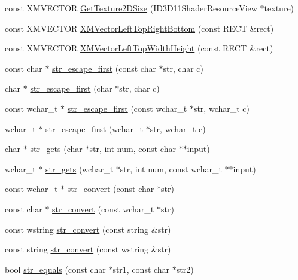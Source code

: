 \begin{DoxyCompactItemize}
\item 
const X\+M\+V\+E\+C\+T\+OR \hyperlink{namespacemage_a32e962380f439a26629371c492643616}{Get\+Texture2\+D\+Size} (I\+D3\+D11\+Shader\+Resource\+View $\ast$texture)
\item 
const X\+M\+V\+E\+C\+T\+OR \hyperlink{namespacemage_aa049ddf42f2937d6bc7f730f4eabf57a}{X\+M\+Vector\+Left\+Top\+Right\+Bottom} (const R\+E\+CT \&rect)
\item 
const X\+M\+V\+E\+C\+T\+OR \hyperlink{namespacemage_a21b11fa85a84f903e3bd4678bf655270}{X\+M\+Vector\+Left\+Top\+Width\+Height} (const R\+E\+CT \&rect)
\item 
const char $\ast$ \hyperlink{namespacemage_a451f2cac5de5cebbe8bc004b3f29857b}{str\+\_\+escape\+\_\+first} (const char $\ast$str, char c)
\item 
char $\ast$ \hyperlink{namespacemage_a7a7fa3e9439ddbe1f31fe888a2a70e3d}{str\+\_\+escape\+\_\+first} (char $\ast$str, char c)
\item 
const wchar\+\_\+t $\ast$ \hyperlink{namespacemage_ac47b9d026e0ddda47b3d889beb40a2d9}{str\+\_\+escape\+\_\+first} (const wchar\+\_\+t $\ast$str, wchar\+\_\+t c)
\item 
wchar\+\_\+t $\ast$ \hyperlink{namespacemage_a8fbccb44f38a2e8b09baf805e9f34fc1}{str\+\_\+escape\+\_\+first} (wchar\+\_\+t $\ast$str, wchar\+\_\+t c)
\item 
char $\ast$ \hyperlink{namespacemage_ab7f63cc8e67ba97382747bc75fd75f62}{str\+\_\+gets} (char $\ast$str, int num, const char $\ast$$\ast$input)
\item 
wchar\+\_\+t $\ast$ \hyperlink{namespacemage_a881ab89db7712612531d47a64c6dfaa1}{str\+\_\+gets} (wchar\+\_\+t $\ast$str, int num, const wchar\+\_\+t $\ast$$\ast$input)
\item 
const wchar\+\_\+t $\ast$ \hyperlink{namespacemage_aba19c96528a59194ebc100244518f608}{str\+\_\+convert} (const char $\ast$str)
\item 
const char $\ast$ \hyperlink{namespacemage_a93f0e3b596ce1156d1fce19967fc316a}{str\+\_\+convert} (const wchar\+\_\+t $\ast$str)
\item 
const wstring \hyperlink{namespacemage_a9a7ff7b35c293ad8f09d5603f78e4c52}{str\+\_\+convert} (const string \&str)
\item 
const string \hyperlink{namespacemage_a5425aab167b483cdf05a6aaf0d074ed1}{str\+\_\+convert} (const wstring \&str)
\item 
bool \hyperlink{namespacemage_a4f78f15f269c1f65d4148983bc8224c5}{str\+\_\+equals} (const char $\ast$str1, const char $\ast$str2)

\end{DoxyCompactItemize}
